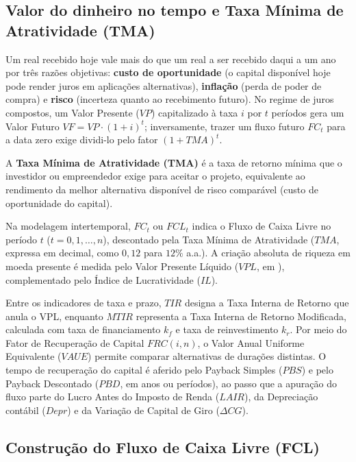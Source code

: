 
\subsection{Valor do dinheiro no tempo e Taxa Mínima de Atratividade (TMA)}

Um real recebido hoje vale mais do que um real a ser recebido daqui a um ano por três razões objetivas: \textbf{custo de oportunidade} (o capital disponível hoje pode render juros em aplicações alternativas), \textbf{inflação} (perda de poder de compra) e \textbf{risco} (incerteza quanto ao recebimento futuro). No regime de juros compostos, um Valor Presente ($VP$) capitalizado à taxa $i$ por $t$ períodos gera um Valor Futuro $VF = VP \cdot (1 + i)^t$; inversamente, trazer um fluxo futuro $FC_t$ para a data zero exige dividi-lo pelo fator $(1 + TMA)^t$.

A \textbf{Taxa Mínima de Atratividade (TMA)} é a taxa de retorno mínima que o investidor ou empreendedor exige para aceitar o projeto, equivalente ao rendimento da melhor alternativa disponível de risco comparável (custo de oportunidade do capital).

\begin{boxSimbolo}
Na modelagem intertemporal, $FC_t$ ou $FCL_t$ indica o Fluxo de Caixa Livre no período $t$ ($t = 0, 1, \dots, n$), descontado pela Taxa Mínima de Atratividade ($TMA$, expressa em decimal, como $0{,}12$ para $12\%$ a.a.). A criação absoluta de riqueza em moeda presente é medida pelo Valor Presente Líquido ($VPL$, em \reais{}), complementado pelo Índice de Lucratividade ($IL$).

Entre os indicadores de taxa e prazo, $TIR$ designa a Taxa Interna de Retorno que anula o VPL, enquanto $MTIR$ representa a Taxa Interna de Retorno Modificada, calculada com taxa de financiamento $k_f$ e taxa de reinvestimento $k_r$. Por meio do Fator de Recuperação de Capital $FRC(i,n)$, o Valor Anual Uniforme Equivalente ($VAUE$) permite comparar alternativas de durações distintas. O tempo de recuperação do capital é aferido pelo Payback Simples ($PBS$) e pelo Payback Descontado ($PBD$, em anos ou períodos), ao passo que a apuração do fluxo parte do Lucro Antes do Imposto de Renda ($LAIR$), da Depreciação contábil ($Depr$) e da Variação de Capital de Giro ($\Delta CG$).
\end{boxSimbolo}

\subsection{Construção do Fluxo de Caixa Livre (FCL)}

